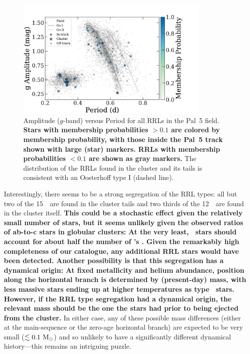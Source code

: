 \documentclass[twocolumn]{aastex63}
\newcommand{\changes}[1]{{\textbf{#1}}}
\newcommand{\NRRab}{15}    %
\newcommand{\NRRc}{12}     %
\begin{document}
\begin{figure}[t]
\begin{center}
\includegraphics[width=0.85\textwidth]{rrls_PA.pdf} 
\caption{Amplitude ($g$-band) versus Period for all RRLs in the Pal~5 field. \changes{Stars with membership probabilities $>0.1$ are colored by membership probability, with those inside the Pal~5 track shown with large (star) markers. RRLs with membership probabilities $<0.1$ are shown as gray markers.} The distribution of the RRLs found in the cluster and its tails is consistent with an Oosterhoff type I (dashed line). }
\label{fig:PA_diagram}
\end{center}
\end{figure}

Interestingly, there seems to be a strong segregation of the RRL types: all but two of the \NRRab\ \rrab~are found in the cluster tails and two thirds of the \NRRc\ \rrc~are found in the cluster itself. \changes{
This could be a stochastic effect given the relatively small number of stars, but it seems unlikely given the observed ratios of ab-to-c stars in globular clusters: At the very least, \rrab~stars should account for about half the number of \rrc's \citep[only 5 out of >150 globulars have more than twice as many type~\typec\ than type \typeab\  RRLs, see][]{Clement:2017,Clement:2001,Catelan:2009}. Given the remarkably high completeness of our catalogue, any additional RRL stars would have been detected. Another possibility is that this segregation has a dynamical origin: At fixed metallicity and helium abundance, position along the horizontal branch is determined by (present-day) mass, with less massive stars ending up at higher temperatures as type \typec~stars.
However, if the RRL type segregation had a dynamical origin, the relevant mass should be the one the stars had prior to being ejected from the cluster.} In either case, any of these possible mass differences (either at the main-sequence or the zero-age horizontal branch) are expected to be very small ($\lesssim 0.1~\mathrm{M}_\odot$) and so unlikely to have a significantly different dynamical history---this remains an intriguing puzzle.
\end{document}
